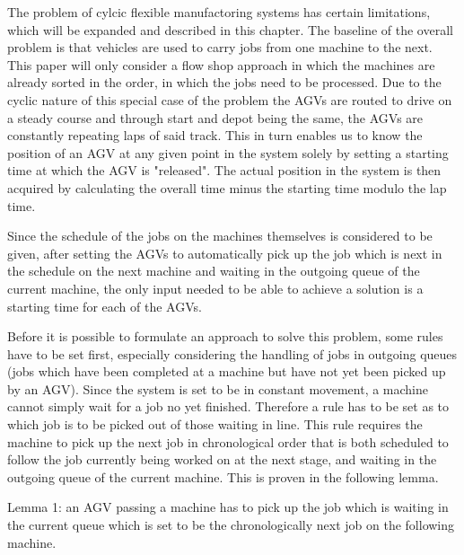 
The problem of cylcic flexible manufactoring systems has certain limitations, which will be expanded and described in this chapter. The baseline
of the overall problem is that vehicles are used to carry jobs from one machine to the next. This paper will only consider
a flow shop approach in which the machines are already sorted in the order, in which the jobs need to be processed. Due to the cyclic nature of
this special case of the problem the AGVs are routed to drive on a steady course and through start and depot being the same, the AGVs
are constantly repeating laps of said track. This in turn enables us to know the position of an AGV at any given point in the system solely by
setting a starting time at which the AGV is "released". The actual position in the system is then acquired by calculating the overall time minus
the starting time modulo the lap time.

Since the schedule of the jobs on the machines themselves is considered to be given, after setting the AGVs to automatically pick up the job 
which is next in the schedule on the next machine and waiting in the outgoing queue of the current machine, the only input needed to be able
to achieve a solution is a starting time for each of the AGVs.

Before it is possible to formulate an approach to solve this problem, some rules have to be set first, especially considering the handling of
jobs in outgoing queues (jobs which have been completed at a machine but have not yet been picked up by an AGV). Since the system is set to be
in constant movement, a machine cannot simply wait for a job no yet finished. Therefore a rule has to be set as to which job is to be picked out
of those waiting in line. This rule requires the machine to pick up the next job in chronological order that is both scheduled to follow the job
currently being worked on at the next stage, and waiting in the outgoing queue of the current machine. This is proven in the following lemma.


Lemma 1: an AGV passing a machine has to pick up the job which is waiting in the current queue which is set to be the chronologically next job
on the following machine.


